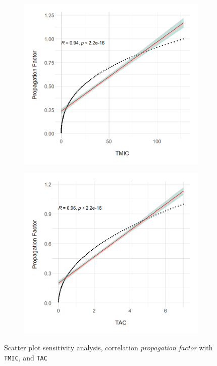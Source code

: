 \begin{figure}[ht!]
\begin{center}
  \begin{subfigure}[b]{0.7\textwidth}
    \includegraphics[width=\textwidth]{figures/results/Rplot_spoon-core_eclipse-osgi_TMIC.png}
  \end{subfigure}
  \begin{subfigure}[b]{0.7\textwidth}
    \includegraphics[width=\textwidth]{figures/results/Rplot_spoon-core_eclipse-osgi_TAC.png}
  \end{subfigure}
\caption{Scatter plot sensitivity analysis, correlation \textit{propagation factor} with \texttt{TMIC}, and \texttt{TAC}}
\label{fig:correlation-sensitivity}
\end{center}
\end{figure}

